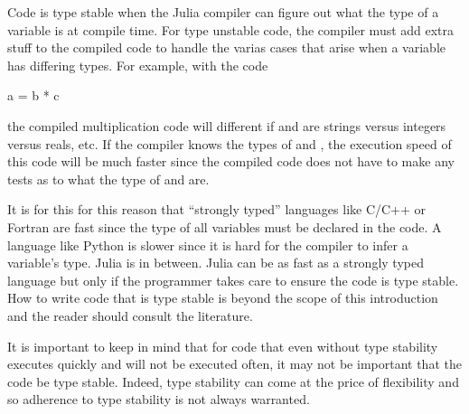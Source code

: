 Code is type stable when the Julia compiler can figure out what the type of a variable is at compile
time. For type unstable code, the compiler must add extra stuff to the compiled code to handle the
varias cases that arise when a variable has differing types. For example, with the code
\begin{example}
  a = b * c
\end{example}
the compiled multiplication code will different if  and  are strings versus integers versus reals, etc.
If the compiler knows the types of  and , the execution speed of this code will be much
faster since the compiled code does not have to make any tests as to what the type of  and 
are. 

It is for this for this reason that ``strongly typed'' languages like C/C++ or Fortran are fast since
the type of all variables must be  declared in the code. A language like Python is slower since 
it is hard for the compiler to infer a variable's type. Julia is in between. Julia can be as fast as
a strongly typed language but only if the programmer takes care to ensure the code is type stable.
How to write code that is type stable is beyond the scope of this introduction and the reader should
consult the literature.

It is important to keep in mind that for code that even without type stability executes quickly and 
will not be executed often, it may not be important that the code be type stable. Indeed,
type stability can come at the price of flexibility and so adherence to type stability is not always warranted.